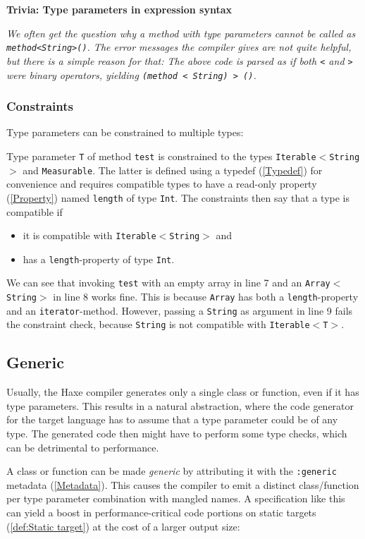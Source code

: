 \documentclass{article}
\newcommand{\type}[1]{\texttt{#1}}
\newcommand{\expr}[1]{\texttt{#1}}
\newenvironment{myshaded}
  {\def\FrameCommand{\fboxsep=\topsep\colorbox{bgcolor}}%
  \MakeFramed {\advance\hsize-\width \FrameRestore}}%
 {\endMakeFramed}
\newcommand{\trivia}[2]
	{\begin{myshaded}\noindent\textbf{Trivia: #1}\par\nobreak\noindent\ignorespaces\textit{#2}\end{myshaded}}
\newcommand{\tref}[2]{#1 (\ref{#2})}
\newcommand{\haxe}[2][]{%
}
\begin{document}
\trivia{Type parameters in expression syntax}{We often get the question why a method with type parameters cannot be called as \expr{method<String>()}. The error messages the compiler gives are not quite helpful, but there is a simple reason for that: The above code is parsed as if both \expr{<} and \expr{>} were binary operators, yielding \expr{(method < String) > ()}.}

\subsubsection{Constraints}
\label{Constraints}

Type parameters can be constrained to multiple types:

\haxe{assets/Constraints.hx}
Type parameter \type{T} of method \expr{test} is constrained to the types \type{Iterable$<$String$>$} and \type{Measurable}. The latter is defined using a \tref{typedef}{Typedef} for convenience and requires compatible types to have a read-only \tref{property}{Property} named \expr{length} of type \type{Int}. The constraints then say that a type is compatible if

\begin{itemize}
	\item it is compatible with \type{Iterable$<$String$>$} and
	\item has a \expr{length}-property of type \type{Int}.
\end{itemize}
We can see that invoking \expr{test} with an empty array in line 7 and an \type{Array$<$String$>$} in line 8 works fine. This is because \type{Array} has both a \expr{length}-property and an \expr{iterator}-method. However, passing a \type{String} as argument in line 9 fails the constraint check, because \type{String} is not compatible with \type{Iterable$<$T$>$}. 


\subsection{Generic}
\label{Generic}

Usually, the Haxe compiler generates only a single class or function, even if it has type parameters. This results in a natural abstraction, where the code generator for the target language has to assume that a type parameter could be of any type. The generated code then might have to perform some type checks, which can be detrimental to performance.

A class or function can be made \emph{generic} by attributing it with the \expr{:generic} \tref{metadata}{Metadata}. This causes the compiler to emit a distinct class/function per type parameter combination with mangled names. A specification like this can yield a boost in performance-critical code portions on \tref{static targets}{def:Static target} at the cost of a larger output size:
\end{document}
